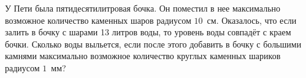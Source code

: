 	У Пети была пятидесятилитровая бочка. Он поместил в нее максимально возможное количество каменных шаров радиусом $10$~см. Оказалось, что если залить в бочку с шарами 13 литров воды, то уровень воды совпадёт с краем бочки. Сколько воды выльется, если после этого добавить в бочку с большими камнями максимально возможное количество круглых каменных шариков радиусом  $1$~мм?